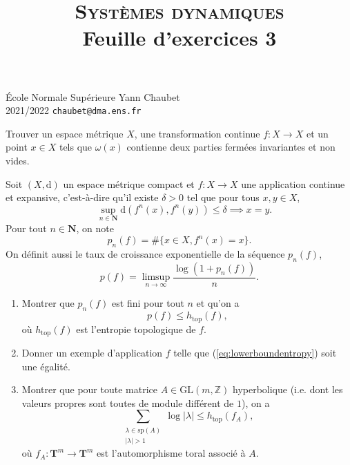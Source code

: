 \documentclass[a4paper,10pt,openany]{article}
\title{\textsc{Syst\`emes dynamiques} \\ Feuille d'exercices 3}
\date{}
\author{}
\theoremstyle{plain}
\theoremstyle{definition}
\newcommand{\dd}{\mathrm{d}}
\newcommand{\T}{\mathbf{T}}
\newcommand{\N}{\mathbf{N}}
\begin{document}
{\noindent \'Ecole Normale Sup\'erieure  \hfill Yann Chaubet } \\
{2021/2022 \hfill \texttt{chaubet@dma.ens.fr}}

{\let\newpage\relax\maketitle}
\maketitle

 \vspace{1.5mm} 

\noindent Trouver un espace m\'etrique $X$, une transformation continue $f : X \to X$ et un point $x \in X$ tels que $\omega(x)$ contienne deux parties ferm\'ees invariantes et non vides.

\vspace{0.6cm}

 \vspace{1.5mm} 

\noindent Soit $(X, \dd)$ un espace m\'etrique compact et $f : X \to X$ une application continue et expansive, c'est-\`a-dire qu'il existe $\delta > 0$ tel que pour tous $x, y \in X$,
$$
\quad \sup_{n\in \N} \dd(f^n(x),f^n(y)) \leq \delta \implies x = y.
$$
Pour tout $n \in \N$, on note
$$
p_n(f) = \#\{x \in X, f^n(x) = x\}.
$$
On d\'efinit aussi le taux de croissance exponentielle de la s\'equence $p_n(f)$,
$$
p(f) = \limsup_{n \to \infty} \frac{\log(1 + p_n(f))}{n}.
$$
\begin{enumerate}
\item Montrer que $p_n(f)$ est fini pour tout $n$ et qu'on a
\begin{equation}\label{eq:lowerboundentropy}
p(f) \leq h_{\mathrm{top}}(f),
\end{equation}
o\`u $h_\mathrm{top}(f)$ est l'entropie topologique de $f$.
\item Donner un exemple d'application $f$ telle que (\ref{eq:lowerboundentropy}) soit une \'egalit\'e.
\item Montrer que pour toute matrice $A \in \mathrm{GL}(m,\mathbb{Z})$ hyperbolique (i.e. dont les valeurs propres sont toutes de module diff\'erent de $1$), on a
$$
\sum_{\substack{\lambda \in \mathrm{sp}(A) \\ |\lambda| > 1 }} \log |\lambda| \leq h_\mathrm{top}(f_A),
$$
o\`u $f_A : \T^m \to \T^m$ est l'automorphisme toral associ\'e \`a $A$.
\end{enumerate}
\end{document}
